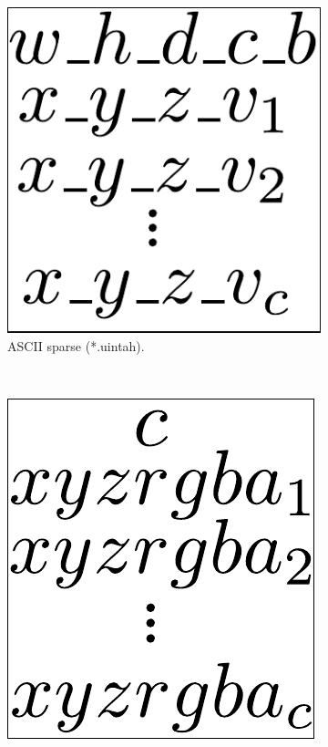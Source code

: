 \begin{figure}[htpb!]
\begin{subfigure}[t]{0.3\textwidth}
                \includegraphics[width=\textwidth]{img/file_format_ascii_sparse}
                \caption{ASCII sparse (*.uintah).}
                \label{fig:file_format_ascii_sparse}
        \end{subfigure}
        ~ %
        \begin{subfigure}[t]{0.282\textwidth}
                \includegraphics[width=\textwidth]{img/file_format_binary}

\end{subfigure}
\end{figure}
